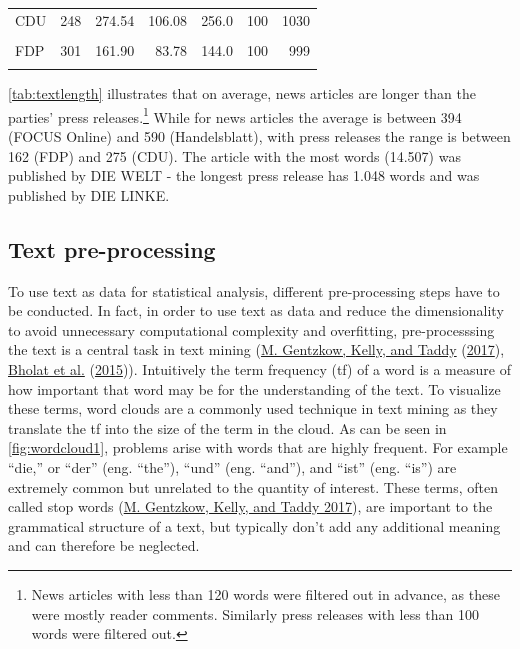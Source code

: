 \documentclass[
]{article}
\begin{document}
\begin{table}[H]
\begin{tabular}[t]{lrrrrrr}
\hspace{1em}CDU & 248 & 274.54 & 106.08 & 256.0 & 100 & 1030\\
\hspace{1em}\cellcolor{gray!6}{DIE LINKE} & \cellcolor{gray!6}{686} & \cellcolor{gray!6}{200.47} & \cellcolor{gray!6}{71.78} & \cellcolor{gray!6}{190.0} & \cellcolor{gray!6}{101} & \cellcolor{gray!6}{1048}\\
\hspace{1em}FDP & 301 & 161.90 & 83.78 & 144.0 & 100 & 999\\
\hspace{1em}\cellcolor{gray!6}{SPD} & \cellcolor{gray!6}{315} & \cellcolor{gray!6}{213.41} & \cellcolor{gray!6}{56.16} & \cellcolor{gray!6}{208.0} & \cellcolor{gray!6}{103} & \cellcolor{gray!6}{429}\\
\bottomrule
\end{tabular}
\end{table}

\autoref{tab:textlength} illustrates that on average, news articles are
longer than the parties' press releases.\footnote{News articles with
  less than 120 words were filtered out in advance, as these were mostly
  reader comments. Similarly press releases with less than 100 words
  were filtered out.} While for news articles the average is between 394
(FOCUS Online) and 590 (Handelsblatt), with press releases the range is
between 162 (FDP) and 275 (CDU). The article with the most words
(14.507) was published by DIE WELT - the longest press release has 1.048
words and was published by DIE LINKE.

\hypertarget{text-pre-processing}{%
\subsection{Text pre-processing}\label{text-pre-processing}}

To use text as data for statistical analysis, different pre-processing
steps have to be conducted. In fact, in order to use text as data and
reduce the dimensionality to avoid unnecessary computational complexity
and overfitting, pre-processsing the text is a central task in text
mining (\protect\hyperlink{ref-gentzkow_text_2017}{M. Gentzkow, Kelly,
and Taddy} (\protect\hyperlink{ref-gentzkow_text_2017}{2017}),
\protect\hyperlink{ref-bholat_text_2015}{Bholat et al.}
(\protect\hyperlink{ref-bholat_text_2015}{2015})). Intuitively the term
frequency (tf) of a word is a measure of how important that word may be
for the understanding of the text. To visualize these terms, word clouds
are a commonly used technique in text mining as they translate the tf
into the size of the term in the cloud. As can be seen in
\autoref{fig:wordcloud1}, problems arise with words that are highly
frequent. For example ``die,'' or ``der'' (eng. ``the''), ``und'' (eng.
``and''), and ``ist'' (eng. ``is'') are extremely common but unrelated
to the quantity of interest. These terms, often called stop words
(\protect\hyperlink{ref-gentzkow_text_2017}{M. Gentzkow, Kelly, and
Taddy 2017}), are important to the grammatical structure of a text, but
typically don't add any additional meaning and can therefore be
neglected.
\end{document}
